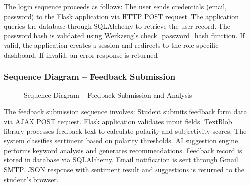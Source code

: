 The login sequence proceeds as follows: The user sends credentials (email, password) to the Flask application via HTTP POST request. The application queries the database through SQLAlchemy to retrieve the user record. The password hash is validated using Werkzeug's check\_password\_hash function. If valid, the application creates a session and redirects to the role-specific dashboard. If invalid, an error response is returned.

\subsubsection{Sequence Diagram -- Feedback Submission}

\begin{figure}[H]
\centering
{}
\caption{Sequence Diagram -- Feedback Submission and Analysis}
\label{fig:seqfeedback}
\end{figure}

The feedback submission sequence involves: Student submits feedback form data via AJAX POST request. Flask application validates input fields. TextBlob library processes feedback text to calculate polarity and subjectivity scores. The system classifies sentiment based on polarity thresholds. AI suggestion engine performs keyword analysis and generates recommendations. Feedback record is stored in database via SQLAlchemy. Email notification is sent through Gmail SMTP. JSON response with sentiment result and suggestions is returned to the student's browser.

